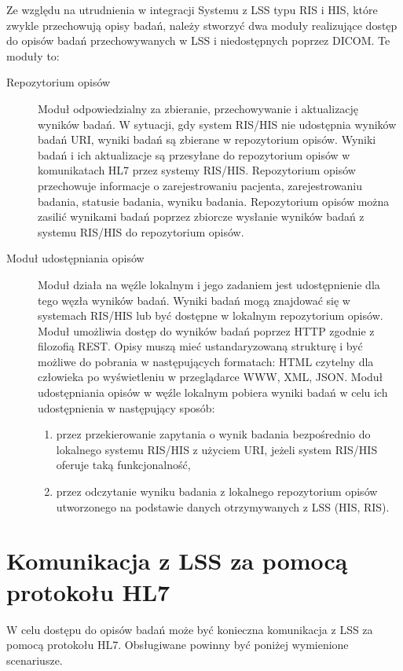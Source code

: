 \documentclass[a4paper]{report}
\begin{document}
Ze względu na utrudnienia w integracji Systemu z LSS typu RIS i HIS, które zwykle przechowują opisy badań, należy stworzyć dwa moduły realizujące dostęp do opisów badań przechowywanych w LSS i niedostępnych poprzez DICOM. Te moduły to:
\begin{description}
  \item[Repozytorium opisów] Moduł odpowiedzialny za zbieranie, przechowywanie i aktualizację wyników badań. W sytuacji, gdy system RIS/HIS nie udostępnia wyników badań URI, wyniki badań są zbierane w repozytorium opisów. Wyniki badań i ich aktualizacje są przesyłane do repozytorium opisów w komunikatach HL7 przez systemy RIS/HIS. Repozytorium opisów przechowuje informacje o zarejestrowaniu pacjenta, zarejestrowaniu badania, statusie badania, wyniku badania. Repozytorium opisów można zasilić wynikami badań poprzez zbiorcze wysłanie wyników badań z systemu RIS/HIS do repozytorium opisów.
  \item[Moduł udostępniania opisów] Moduł działa na węźle lokalnym i jego zadaniem jest udostępnienie dla tego węzła wyników badań. Wyniki badań mogą znajdować się w systemach RIS/HIS lub być dostępne w lokalnym repozytorium opisów. Moduł umożliwia dostęp do wyników badań poprzez HTTP zgodnie z filozofią REST. Opisy muszą mieć ustandaryzowaną strukturę i być możliwe do pobrania w następujących formatach: HTML czytelny dla człowieka po wyświetleniu w przeglądarce WWW, XML, JSON. Moduł udostępniania opisów w węźle lokalnym pobiera wyniki badań w celu ich udostępnienia w następujący sposób:
  \begin{enumerate}
    \item przez przekierowanie zapytania o wynik badania bezpośrednio do lokalnego systemu RIS/HIS z użyciem URI, jeżeli system RIS/HIS oferuje taką funkcjonalność,
    \item przez odczytanie wyniku badania z lokalnego repozytorium opisów utworzonego na podstawie danych otrzymywanych z LSS (HIS, RIS).
  \end{enumerate}

\end{description}

\section{Komunikacja z LSS za pomocą protokołu HL7}

W celu dostępu do opisów badań może być konieczna komunikacja z LSS za pomocą protokołu HL7. Obsługiwane powinny być poniżej wymienione scenariusze.
\end{document}
